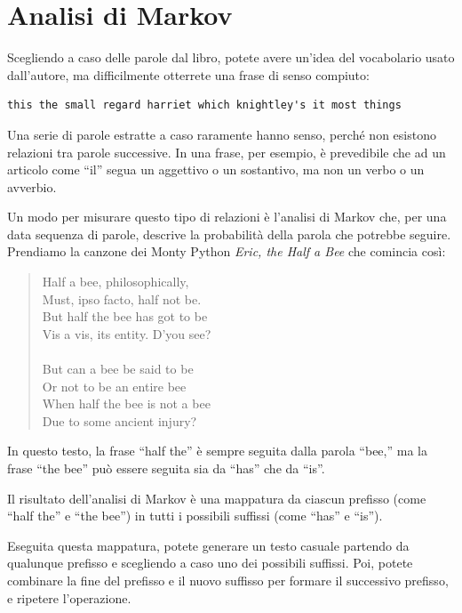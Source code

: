 \documentclass[10pt]{book}
\begin{document}
\section{Analisi di Markov}
\label{markov}

Scegliendo a caso delle parole dal libro, potete avere un'idea del vocabolario usato dall'autore, ma difficilmente otterrete una frase di senso compiuto:

\begin{verbatim}
this the small regard harriet which knightley's it most things
\end{verbatim}
%
Una serie di parole estratte a caso raramente hanno senso, perché non esistono relazioni tra parole successive. In una frase, per esempio, è prevedibile che ad un articolo come ``il'' segua un aggettivo o un sostantivo, ma non un verbo o un avverbio.

Un modo per misurare questo tipo di relazioni è l'analisi di Markov che, per una data sequenza di parole, descrive la probabilità della parola che potrebbe seguire. Prendiamo la canzone dei Monty Python {\em Eric, the Half a Bee} che comincia così:

\begin{quote}
Half a bee, philosophically, \\
Must, ipso facto, half not be. \\
But half the bee has got to be \\
Vis a vis, its entity. D'you see? \\
\\
But can a bee be said to be \\
Or not to be an entire bee \\
When half the bee is not a bee \\
Due to some ancient injury? \\
\end{quote}
%
In questo testo, la frase ``half the'' è sempre seguita dalla parola ``bee,''
ma la frase ``the bee'' può essere seguita sia da
``has'' che da ``is''.

Il risultato dell'analisi di Markov è una mappatura da ciascun prefisso
(come ``half the'' e ``the bee'') in tutti i possibili suffissi (come ``has'' e ``is'').

Eseguita questa mappatura, potete generare un testo casuale partendo da qualunque prefisso e scegliendo a caso uno dei possibili suffissi. Poi, potete combinare la fine del prefisso e il nuovo suffisso per formare il successivo prefisso, e ripetere l'operazione.
\end{document}
